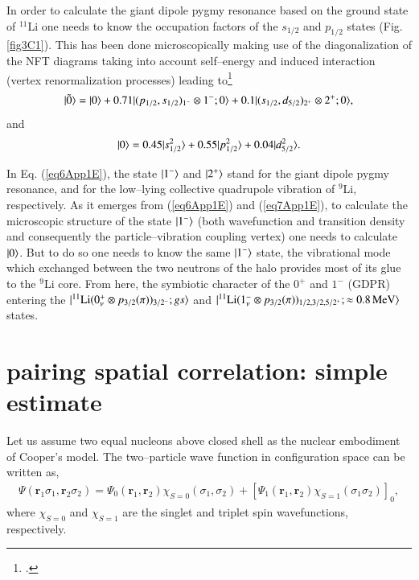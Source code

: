 \begin{subappendices}
In order to calculate the giant dipole pygmy resonance based on the ground state of $^{11}$Li one needs to know the occupation factors of the $s_{1/2}$ and $p_{1/2}$ states (Fig. \ref{fig3C1}). This has been done microscopically making use of the diagonalization of the NFT diagrams taking into account self--energy and induced interaction (vertex renormalization processes) leading to\footnote{\cite{Barranco:01}.}
\begin{align}\label{eq6App1E}
|{\tilde 0} \rangle=|{0} \rangle+0.71|{(p_{1/2},s_{1/2})_{1^-}\otimes1^-;0} \rangle+0.1|{(s_{1/2},d_{5/2})_{2^+}\otimes2^+;0} \rangle,
\end{align}
and 
\begin{align}\label{eq7App1E}
|{0} \rangle=0.45|{s_{1/2}^2} \rangle+0.55|{p_{1/2}^2} \rangle+0.04|{d_{5/2}^2} \rangle.
\end{align}

In Eq. (\ref{eq6App1E}), the state $|{1^-} \rangle$ and $|{2^+} \rangle$ stand for the giant dipole pygmy resonance, and for the low--lying collective quadrupole vibration of $^9$Li, respectively. As it emerges from (\ref{eq6App1E}) and (\ref{eq7App1E}), to calculate the microscopic structure of the state $|{1^-} \rangle$ (both wavefunction and transition density and consequently the particle--vibration coupling vertex) one needs to calculate $|{0} \rangle$. But to do so one needs to know the same $|{1^-} \rangle$ state, the vibrational mode which exchanged between the two neutrons of the halo provides most of its glue to the $^9$Li core. From here, the symbiotic character of the $0^+$ and $1^-$ (GDPR) entering the $|{^{11}\text{Li}(0^+_\nu\otimes p_{3/2}(\pi))_{3/2^-};gs} \rangle$ and $|{^{11}\text{Li}(1^-_\nu\otimes p_{3/2}(\pi))_{1/2,3/2,5/2^+};\approx 0.8\, \text{MeV}} \rangle$ states.

 
\section{pairing spatial correlation: simple estimate}\label{app3D}
Let us assume two equal nucleons above closed shell as the nuclear embodiment of Cooper's model. The two--particle wave function in configuration space can be written as,
\begin{align}\label{eq1App3E}
\Psi(\mathbf r_1\sigma_1,\mathbf r_2\sigma_2)=\Psi_0(\mathbf r_1,\mathbf r_2)\chi_{S=0}(\sigma_1,\sigma_2)+\left[\Psi_1(\mathbf r_1,\mathbf r_2)\chi_{S=1}(\sigma_1\sigma_2)\right]_0,
\end{align}
where $\chi_{S=0}$ and $\chi_{S=1}$ are the singlet and triplet spin wavefunctions, respectively.


\end{subappendices}
